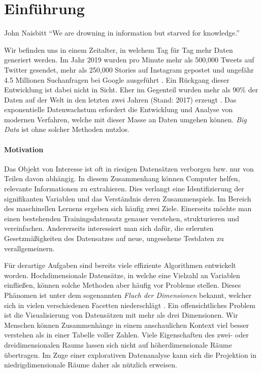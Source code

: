 \chapter{Einführung}

\label{introduction}

\begin{chapquote}{John Naisbitt}
``We are drowning in information but starved for knowledge.''
\end{chapquote}

Wir befinden uns in einem Zeitalter, in welchem Tag für Tag mehr Daten generiert werden. Im Jahr 2019 wurden pro Minute mehr als 500,000 Tweets auf Twitter gesendet, mehr als 250,000 Stories auf Instagram gepostet und ungefähr 4.5 Millionen Suchanfragen bei Google ausgeführt \cite{domo}. Ein Rückgang dieser Entwicklung ist dabei nicht in Sicht. Eher im Gegenteil wurden mehr als 90\% der Daten auf der Welt in den letzten zwei Jahren (Stand: 2017) erzeugt \cite{ibm}. Das exponentielle Datenwachstum erfordert die Entwicklung und Analyse von modernen Verfahren, welche mit dieser Masse an Daten umgehen können. \textit{Big Data} ist ohne solcher Methoden nutzlos.
 
 


\subsubsection{Motivation}

Das Objekt von Interesse ist oft in riesigen Datensätzen verborgen bzw. nur von Teilen davon abhängig. In diesem Zusammenhang können Computer helfen, relevante Informationen zu extrahieren. Dies verlangt eine Identifizierung der signifikanten Variablen und das Verständnis deren Zusammenspiels. Im Bereich des maschinellen Lernens ergeben sich häufig zwei Ziele. Einerseits möchte man einen bestehenden Trainingsdatensatz genauer verstehen, strukturieren und vereinfachen. Andererseits interessiert man sich dafür, die erlernten Gesetzmäßigkeiten des Datensatzes auf neue, ungesehene Testdaten zu verallgemeinern. 

Für derartige Aufgaben sind bereits viele effiziente Algorithmen entwickelt worden. Hochdimensionale Datensätze, in welche eine Vielzahl an Variablen einfließen, können solche Methoden aber häufig vor Probleme stellen. Dieses Phänomen ist unter dem sogenannten \textit{Fluch der Dimensionen} bekannt, welcher sich in vielen verschiedenen Facetten niederschlägt \cite{bellman}. Ein offensichtliches Problem ist die Visualisierung von Datensätzen mit mehr als drei Dimensionen. Wir Menschen können Zusammenhänge in einem anschaulichen Kontext viel besser verstehen als in einer Tabelle voller Zahlen. Viele Eigenschaften des zwei- oder dreidimensionalen Raums lassen sich nicht auf höherdimensionale Räume übertragen. Im Zuge einer explorativen Datenanalyse kann sich die Projektion in niedrigdimensionale Räume daher als nützlich erweisen.

